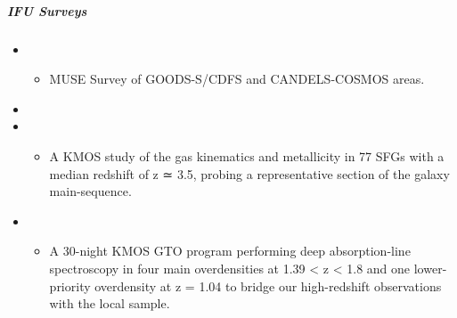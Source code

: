 \documentclass[letterpaper,10pt,english]{sphinxmanual}
\begin{document}
\subparagraph{IFU Surveys}
\label{\detokenize{resource/astro/topics/extragalactic_astronomy:ifu-surveys}}\begin{itemize}
\item {} 
\begin{itemize}
\item {} 
MUSE Survey of GOODS-S/CDFS and CANDELS-COSMOS areas.

\end{itemize}

\item {} 

\item {} 
\begin{itemize}
\item {} 
A KMOS study of the gas kinematics and metallicity in 77 SFGs with
a median redshift of z ≃ 3.5, probing a representative section of
the galaxy main-sequence.

\end{itemize}

\item {} 
\begin{itemize}
\item {} 
A 30-night KMOS GTO program performing deep absorption-line
spectroscopy in four main overdensities at 1.39 \textless{} z \textless{} 1.8 and one
lower-priority overdensity at z = 1.04 to bridge our high-redshift
observations with the local sample.

\end{itemize}

\end{itemize}
\end{document}

